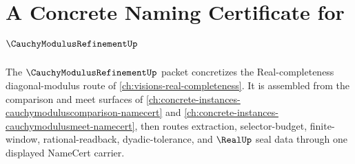 \chapter{A Concrete Naming Certificate for $\CauchyModulusRefinementUp$}
\label{ch:concrete-instances-cauchy-modulus-refinement-namecert}

The $\CauchyModulusRefinementUp$ packet concretizes the Real-completeness diagonal-modulus route of \autoref{ch:visions-real-completeness}. It is assembled from the comparison and meet surfaces of \autoref{ch:concrete-instances-cauchymoduluscomparison-namecert} and \autoref{ch:concrete-instances-cauchymodulusmeet-namecert}, then routes extraction, selector-budget, finite-window, rational-readback, dyadic-tolerance, and $\RealUp$ seal data through one displayed NameCert carrier.

